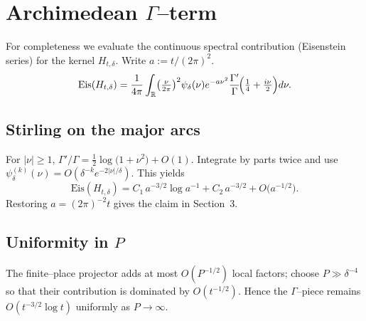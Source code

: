 \appendix
\section{Archimedean $\Gamma$--term}
\label{app:arch_gamma}

For completeness we evaluate the continuous
spectral contribution (Eisenstein series) for the kernel $H_{t,\delta}$.
Write $a:=t/(2\pi)^{2}$.
\[
   \mathrm{Eis}(H_{t,\delta})
     =\frac1{4\pi}\int_{\Bbb R}
        \bigl(\tfrac{\nu}{2\pi}\bigr)^{2}\psi_\delta(\nu)
        e^{-a\nu^{2}}
        \frac{\Gamma'}{\Gamma}\!\Bigl(\tfrac14+\tfrac{i\nu}{2}\Bigr)
        d\nu .
\]

\subsection*{Stirling on the major arcs}
For $|\nu|\ge1$,
\(\Gamma'/\Gamma=\tfrac12\log\bigl(1+\nu^{2}\bigr)+O(1)\).
Integrate by parts twice and use
$\psi_\delta^{(k)}(\nu)=O(\delta^{-k}e^{-2|\nu|/\delta})$.
This yields
\[
  \mathrm{Eis}(H_{t,\delta})
     = C_{1}\,a^{-3/2}\log a^{-1}
       + C_{2}\,a^{-3/2}
       + O\!\bigl(a^{-1/2}\bigr).
\]
Restoring $a=(2\pi)^{-2}t$ gives the claim in Section~3.

\subsection*{Uniformity in $P$}
The finite–place projector adds at most
$O(P^{-1/2})$ local factors; choose $P\gg\delta^{-4}$
so that their contribution is dominated by
$O(t^{-1/2})$.
Hence the $\Gamma$–piece remains $O(t^{-3/2}\log t)$
uniformly as $P\to\infty$. 